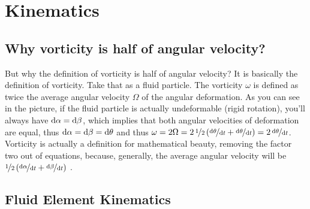 \chapter{Kinematics}


\section{Why vorticity is half of angular velocity?}


But why the definition of vorticity is half of angular velocity?
It is basically the definition of vorticity. Take that as a fluid particle.
The vorticity \(\omega\) is defined as twice the average angular velocity \(\Omega\) of the angular deformation.
As you can see in the picture, if the fluid particle is actually undeformable (rigid rotation), you'll always have \(\mathop{}\!\mathrm{d}\alpha = \mathop{}\!\mathrm{d}\beta\), which implies that both angular velocities of deformation are equal, thus \(\mathop{}\!\mathrm{d}\alpha = \mathop{}\!\mathrm{d}\beta = \mathop{}\!\mathrm{d}\theta\)
and thus \(\omega = 2 \Omega = 2\, \nicefrac{1}{2}\left(\nicefrac{\mathop{}\!\mathrm{d} \theta}{\mathop{}\!\mathrm{d} t} + \nicefrac{\mathop{}\!\mathrm{d} \theta}{\mathop{}\!\mathrm{d} t} \right) = 2\, \nicefrac{\mathop{}\!\mathrm{d} \theta}{\mathop{}\!\mathrm{d} t}\).
Vorticity is actually a definition for mathematical beauty, removing the factor two out of equations, because, generally, the average angular velocity will be \(\nicefrac{1}{2} \left(\nicefrac{\mathop{}\!\mathrm{d} \alpha}{\mathop{}\!\mathrm{d} t} + \nicefrac{\mathop{}\!\mathrm{d} \beta}{\mathop{}\!\mathrm{d} t}\right)\) \cite{quoraHobold}.




\section{Fluid Element Kinematics}



